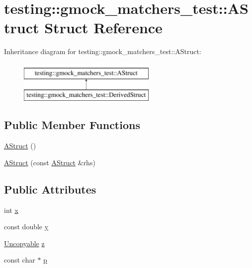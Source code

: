 \hypertarget{structtesting_1_1gmock__matchers__test_1_1AStruct}{}\section{testing\+::gmock\+\_\+matchers\+\_\+test\+::A\+Struct Struct Reference}
\label{structtesting_1_1gmock__matchers__test_1_1AStruct}
Inheritance diagram for testing\+::gmock\+\_\+matchers\+\_\+test\+::A\+Struct\+:\begin{figure}[H]
\begin{center}
\leavevmode
\includegraphics[height=2.000000cm]{structtesting_1_1gmock__matchers__test_1_1AStruct}
\end{center}
\end{figure}
\subsection*{Public Member Functions}
\begin{DoxyCompactItemize}
\item 
\mbox{\hyperlink{structtesting_1_1gmock__matchers__test_1_1AStruct_a6774561607c8ca64809e9ebde4b62b0e}{A\+Struct}} ()
\item 
\mbox{\hyperlink{structtesting_1_1gmock__matchers__test_1_1AStruct_ac5b9c0054e929e8883e13123aef50ff3}{A\+Struct}} (const \mbox{\hyperlink{structtesting_1_1gmock__matchers__test_1_1AStruct}{A\+Struct}} \&rhs)
\end{DoxyCompactItemize}
\subsection*{Public Attributes}
\begin{DoxyCompactItemize}
\item 
int \mbox{\hyperlink{structtesting_1_1gmock__matchers__test_1_1AStruct_a539eea02599ad34ff2bf90cc2c1adf26}{x}}
\item 
const double \mbox{\hyperlink{structtesting_1_1gmock__matchers__test_1_1AStruct_a08b8592764aa4775c3d5a3542470f8bb}{y}}
\item 
\mbox{\hyperlink{classtesting_1_1gmock__matchers__test_1_1Uncopyable}{Uncopyable}} \mbox{\hyperlink{structtesting_1_1gmock__matchers__test_1_1AStruct_a45b1006e4a7b21037610a385dcae6d8c}{z}}
\item 
const char $\ast$ \mbox{\hyperlink{structtesting_1_1gmock__matchers__test_1_1AStruct_a65755db7d763d53c13483bb520f1efcd}{p}}
\end{DoxyCompactItemize}


